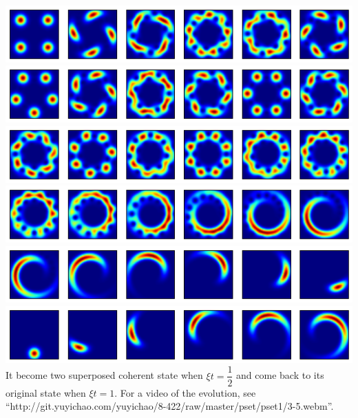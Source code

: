 \documentclass[10pt,fleqn]{article}
\begin{document}
\includegraphics[width=15cm]{3-5-15.png}\\
\includegraphics[width=15cm]{3-5-16.png}\\
\includegraphics[width=15cm]{3-5-17.png}\\
\includegraphics[width=15cm]{3-5-18.png}\\
\includegraphics[width=15cm]{3-5-19.png}\\
\includegraphics[width=15cm]{3-5-20.png}\\
It become two superposed coherent state when $\xi t=\dfrac12$ and come back to its original state when $\xi t=1$. For a video of the evolution, see ``http://git.yuyichao.com/yuyichao/8-422/raw/master/pset/pset1/3-5.webm''.
\end{document}
